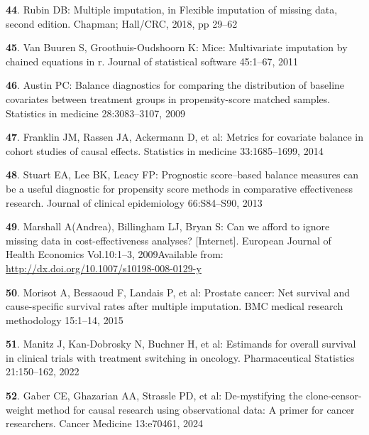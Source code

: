 \documentclass[
  letterpaper,
  DIV=11,
  numbers=noendperiod]{scrartcl}
\newlength{\cslhangindent}
\newenvironment{CSLReferences}[2] %
 {\begin{list}{}{%
  \setlength{\itemindent}{0pt}
  \setlength{\leftmargin}{0pt}
  \setlength{\parsep}{0pt}
  \ifodd #1
   \setlength{\leftmargin}{\cslhangindent}
   \setlength{\itemindent}{-1\cslhangindent}
  \fi
  \setlength{\itemsep}{#2\baselineskip}}}
 {\end{list}}
\begin{document}
\begin{CSLReferences}{0}{1}
\textbf{44}. Rubin DB: Multiple imputation, in Flexible imputation of
missing data, second edition. Chapman; Hall/CRC, 2018, pp 29--62

\textbf{45}. Van Buuren S, Groothuis-Oudshoorn K: Mice: Multivariate
imputation by chained equations in r. Journal of statistical software
45:1--67, 2011

\textbf{46}. Austin PC: Balance diagnostics for comparing the
distribution of baseline covariates between treatment groups in
propensity-score matched samples. Statistics in medicine 28:3083--3107,
2009

\textbf{47}. Franklin JM, Rassen JA, Ackermann D, et al: Metrics for
covariate balance in cohort studies of causal effects. Statistics in
medicine 33:1685--1699, 2014

\textbf{48}. Stuart EA, Lee BK, Leacy FP: Prognostic score--based
balance measures can be a useful diagnostic for propensity score methods
in comparative effectiveness research. Journal of clinical epidemiology
66:S84--S90, 2013

\textbf{49}. Marshall A(Andrea), Billingham LJ, Bryan S: Can we afford
to ignore missing data in cost-effectiveness analyses? {[}Internet{]}.
European Journal of Health Economics Vol.10:1--3, 2009Available from:
\url{http://dx.doi.org/10.1007/s10198-008-0129-y}

\textbf{50}. Morisot A, Bessaoud F, Landais P, et al: Prostate cancer:
Net survival and cause-specific survival rates after multiple
imputation. BMC medical research methodology 15:1--14, 2015

\textbf{51}. Manitz J, Kan-Dobrosky N, Buchner H, et al: Estimands for
overall survival in clinical trials with treatment switching in
oncology. Pharmaceutical Statistics 21:150--162, 2022

\textbf{52}. Gaber CE, Ghazarian AA, Strassle PD, et al: De-mystifying
the clone-censor-weight method for causal research using observational
data: A primer for cancer researchers. Cancer Medicine 13:e70461, 2024

\end{CSLReferences}
\end{document}
